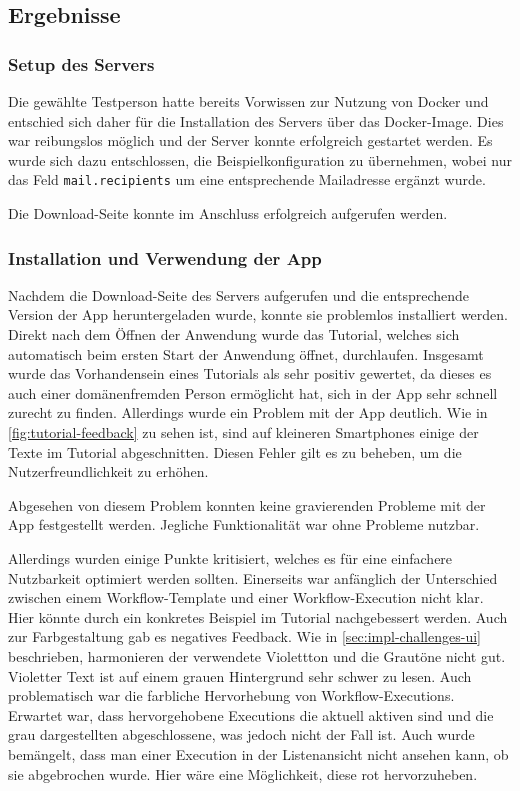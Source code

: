 \subsection{Ergebnisse}

\subsubsection{Setup des Servers}

Die gewählte Testperson hatte bereits Vorwissen zur Nutzung von Docker und entschied sich daher für
die Installation des Servers über das Docker-Image. Dies war reibungslos möglich und der Server konnte
erfolgreich gestartet werden. Es wurde sich dazu entschlossen, die Beispielkonfiguration zu
übernehmen, wobei nur das Feld \texttt{mail.recipients} um eine entsprechende Mailadresse ergänzt
wurde.

Die Download-Seite konnte im Anschluss erfolgreich aufgerufen werden.

\subsubsection{Installation und Verwendung der App}

Nachdem die Download-Seite des Servers aufgerufen und die entsprechende Version der App
heruntergeladen wurde, konnte sie problemlos installiert werden.
Direkt nach dem Öffnen der Anwendung wurde das Tutorial, welches sich automatisch beim ersten Start
der Anwendung öffnet, durchlaufen.
Insgesamt wurde das Vorhandensein eines Tutorials als sehr positiv gewertet, da dieses es auch einer
domänenfremden Person ermöglicht hat, sich in der App sehr schnell zurecht zu finden. Allerdings
wurde ein Problem mit der App deutlich. Wie in \autoref{fig:tutorial-feedback} zu sehen ist, sind
auf kleineren Smartphones einige der Texte im Tutorial abgeschnitten. Diesen Fehler gilt es zu
beheben, um die Nutzerfreundlichkeit zu erhöhen.

Abgesehen von diesem Problem konnten keine gravierenden Probleme mit der App festgestellt werden.
Jegliche Funktionalität war ohne Probleme nutzbar.

Allerdings wurden einige Punkte kritisiert, welches es für eine einfachere Nutzbarkeit optimiert
werden sollten.
Einerseits war anfänglich der Unterschied zwischen einem Workflow-Template und einer
Workflow-Execution nicht klar. Hier könnte durch ein konkretes Beispiel im Tutorial nachgebessert
werden. Auch zur Farbgestaltung gab es negatives Feedback. Wie in \autoref{sec:impl-challenges-ui}
beschrieben, harmonieren der verwendete Violettton und die Grautöne nicht gut. Violetter Text
ist auf einem grauen Hintergrund sehr schwer zu lesen. Auch problematisch war die farbliche
Hervorhebung von Workflow-Executions. Erwartet war, dass hervorgehobene Executions die aktuell
aktiven sind und die grau dargestellten abgeschlossene, was jedoch nicht der Fall ist. Auch wurde
bemängelt, dass man einer Execution in der Listenansicht nicht ansehen kann, ob sie abgebrochen
wurde. Hier wäre eine Möglichkeit, diese rot hervorzuheben.

